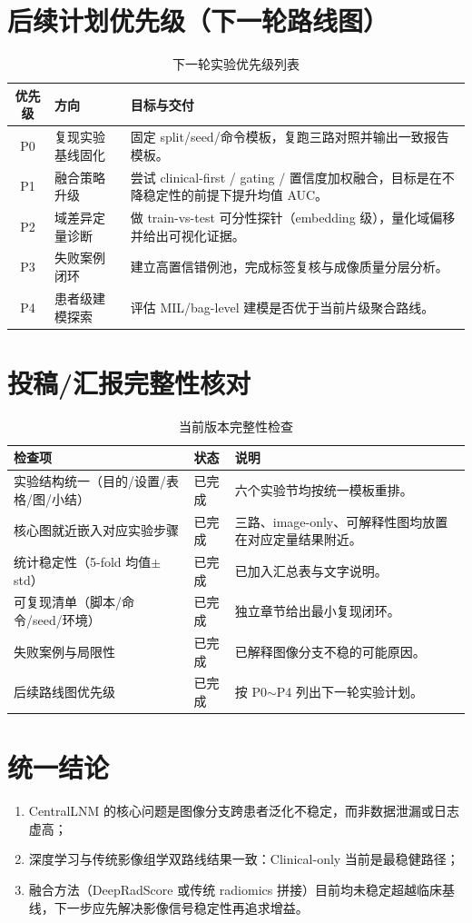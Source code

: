 \documentclass[12pt,a4paper]{ctexart}
\begin{document}
\section{后续计划优先级（下一轮路线图）}

\begin{table}[H]
\centering
\caption{下一轮实验优先级列表}
\begin{tabular}{clp{}}
\toprule
优先级 & 方向 & 目标与交付 \\
\midrule
P0 & 复现实验基线固化 & 固定 split/seed/命令模板，复跑三路对照并输出一致报告模板。 \\
P1 & 融合策略升级 & 尝试 clinical-first / gating / 置信度加权融合，目标是在不降稳定性的前提下提升均值 AUC。 \\
P2 & 域差异定量诊断 & 做 train-vs-test 可分性探针（embedding 级），量化域偏移并给出可视化证据。 \\
P3 & 失败案例闭环 & 建立高置信错例池，完成标签复核与成像质量分层分析。 \\
P4 & 患者级建模探索 & 评估 MIL/bag-level 建模是否优于当前片级聚合路线。 \\
\bottomrule
\end{tabular}
\end{table}

\section{投稿/汇报完整性核对}

\begin{table}[H]
\centering
\caption{当前版本完整性检查}
\begin{tabular}{p{}p{}p{}}
\toprule
检查项 & 状态 & 说明 \\
\midrule
实验结构统一（目的/设置/表格/图/小结） & 已完成 & 六个实验节均按统一模板重排。 \\
核心图就近嵌入对应实验步骤 & 已完成 & 三路、image-only、可解释性图均放置在对应定量结果附近。 \\
统计稳定性（5-fold 均值$\pm$std） & 已完成 & 已加入汇总表与文字说明。 \\
可复现清单（脚本/命令/seed/环境） & 已完成 & 独立章节给出最小复现闭环。 \\
失败案例与局限性 & 已完成 & 已解释图像分支不稳的可能原因。 \\
后续路线图优先级 & 已完成 & 按 P0$\sim$P4 列出下一轮实验计划。 \\
\bottomrule
\end{tabular}
\end{table}

\section{统一结论}

\begin{enumerate}
  \item CentralLNM 的核心问题是图像分支跨患者泛化不稳定，而非数据泄漏或日志虚高；
  \item 深度学习与传统影像组学双路线结果一致：Clinical-only 当前是最稳健路径；
  \item 融合方法（DeepRadScore 或传统 radiomics 拼接）目前均未稳定超越临床基线，下一步应先解决影像信号稳定性再追求增益。
\end{enumerate}
\end{document}
